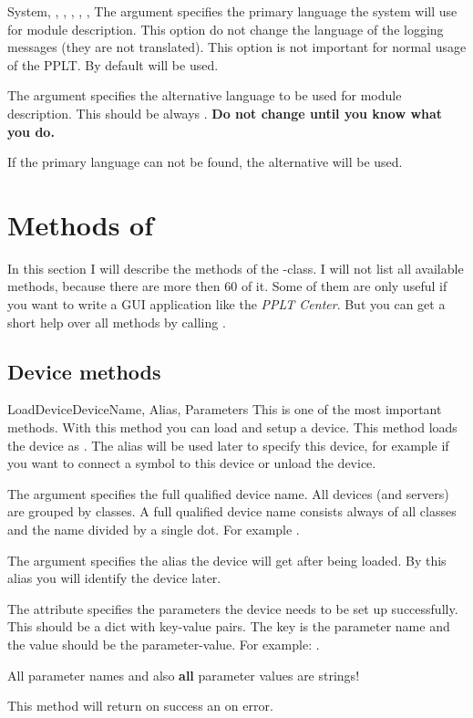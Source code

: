 \begin{classdesc}{System}{, , 
, , , 
, }
The argument  specifies the primary language the system will use for
module description. This option do not change the language of the logging 
messages (they are not translated). This option is not important for normal
usage of the PPLT. By default  will be used.

The argument  specifies the alternative language to be used
for module description. This should be always . \textbf{Do not 
change until you know what you do.} 

If the primary language can not be found, the alternative will be used. 
\end{classdesc}




\section{Methods of }
In this section I will describe the methods of the -class. I 
will not list all available methods, because there are more then 60 of it. Some
of them are only useful if you want to write a GUI application like the
\emph{PPLT Center}. But you can get a short help over all methods by calling
. 


\subsection{Device methods}
\begin{methoddesc}[System]{LoadDevice}{DeviceName, Alias, Parameters}
This is one of the most important methods. With this method you can load and
setup a device. This method loads the device  as . 
The alias will be used later to specify this device, for example if you want
to connect a symbol to this device or unload the device.

The argument  specifies the full qualified device name. All
devices (and servers) are grouped by classes. A full qualified device name
consists always of all classes and the name divided by a single dot. For
example .

The argument  specifies the alias the device will get after being
loaded. By this alias you will identify the device later.

The attribute  specifies the parameters the device needs to be
set up successfully. This should be a dict with key-value pairs. The key 
is the parameter name and the value should be the parameter-value. For example:
.
\begin{notice}
All parameter names and also \textbf{all} parameter values are strings!
\end{notice}

This method will return  on success an  on error.
\end{methoddesc}


